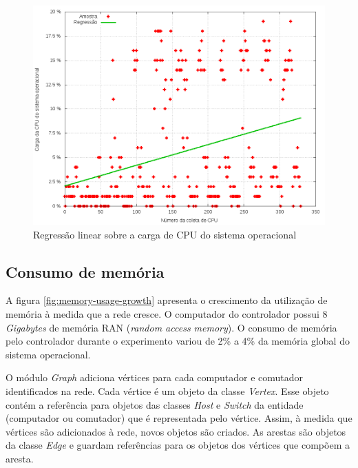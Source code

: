 \begin{figure}[!htb]
    \centering
    \label{fig:scatter-sys-cpu}
    \includegraphics[width=\linewidth]{img/scatter-sys-cpu}
    \caption{Regressão linear sobre a carga de CPU do sistema operacional}
\end{figure}


\subsection{Consumo de memória}

A figura \ref{fig:memory-usage-growth} apresenta o crescimento da utilização
de memória à medida que a rede cresce. 
O computador do controlador possui 8 \emph{Gigabytes} de memória RAN 
(\emph{random access memory}). 
O consumo de memória pelo controlador durante o experimento variou de 2\% a 4\%
da memória global do sistema operacional.

O módulo \emph{Graph} adiciona vértices para cada computador e comutador 
identificados na rede.
Cada vértice é um objeto da classe \emph{Vertex}.
Esse objeto contém a referência para objetos das classes \emph{Host} e 
\emph{Switch} da entidade (computador ou comutador) que é representada pelo
vértice.
Assim, à medida que vértices são adicionados à rede, novos objetos são 
criados.
As arestas são objetos da classe \emph{Edge} e guardam referências para 
os objetos dos vértices que compõem a aresta.

